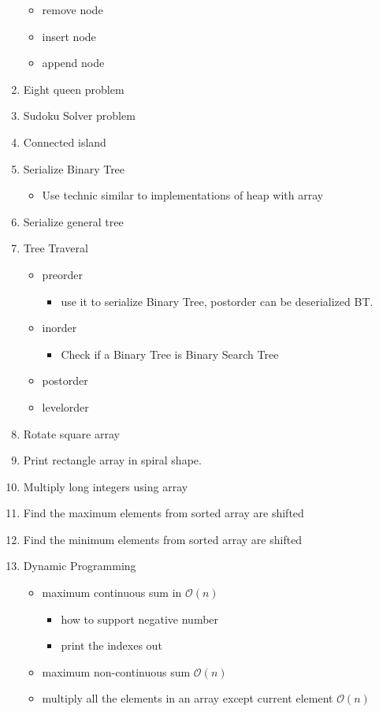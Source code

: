 \documentclass{article}
\begin{document}
\begin{enumerate}
    \begin{itemize}
        \item remove node
        \item insert node
        \item append node
    \end{itemize} 
\item Eight queen problem
\item Sudoku Solver problem
\item Connected island 
\item Serialize Binary Tree 
    \begin{itemize}
    \item Use technic similar to implementations of heap with array  
    \end{itemize} 
\item Serialize general tree 
\item Tree Traveral
    \begin{itemize}
    \item preorder  
        \begin{itemize}
        \item use it to serialize Binary Tree, postorder can be deserialized BT.
        \end{itemize} 
    \item inorder 
    \begin{itemize}
    \item Check if a Binary Tree is Binary Search Tree   
    \end{itemize} 
    \item postorder
    \item levelorder 
\end{itemize} 

\item Rotate square array
\item Print rectangle array in spiral shape.
\item Multiply long integers using array 
\item Find the maximum elements from sorted array are shifted
\item Find the minimum elements from sorted array are shifted
\item Dynamic Programming
    \begin{itemize}
     \item maximum continuous sum in $\mathcal{O}(n)$ 
     \begin{itemize}
     \item how to support negative number
     \item print the indexes out 
     \end{itemize}
     \item maximum non-continuous sum $\mathcal{O}(n)$ 
     \item multiply all the elements in an array except current element $\mathcal{O}(n)$ 


\end{itemize}
\end{enumerate}
\end{document}
